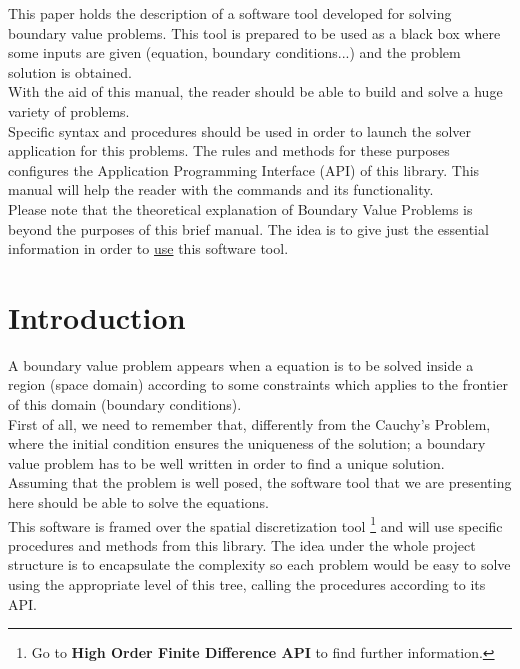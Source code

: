 
This paper holds the description of a software tool developed for
solving boundary value problems. This tool is prepared to be used as a black 
box where some inputs are given (equation, boundary conditions...) and the 
problem solution is obtained.
\\

With the aid of this manual, the reader should be able to build and solve a huge
variety of problems. \\

Specific syntax and procedures should be used in order to launch the solver
application for this problems. The rules and methods for these purposes
configures the Application Programming Interface (API) of this library. This
manual will help the reader with the commands and its functionality. 
\\

Please note that the theoretical explanation of Boundary Value Problems is
beyond the purposes of this brief manual. The idea is to give just the essential
information in order to \underline{use} this software tool. 
\\




\newpage

\section{Introduction}

A boundary value problem appears when a equation is to be solved inside a region
(space domain) according to some constraints which applies to the frontier of
this domain (boundary conditions). \\

First of all, we need to remember that, differently from the Cauchy's Problem,
where the initial condition ensures the uniqueness of the solution; a boundary
value problem has to be well written in order to find a unique solution. \\

Assuming that the problem is well posed, the software tool that we are
presenting here should be able to solve the equations. \\

This software is framed over the spatial discretization tool \footnote{Go to
\textbf{High Order Finite Difference API} to find further information.} and will
use specific procedures and methods from this library. The idea under the whole
project structure is to encapsulate the complexity so each problem would be easy
to solve using the appropriate level of this tree, calling the procedures
according to its API. \\

